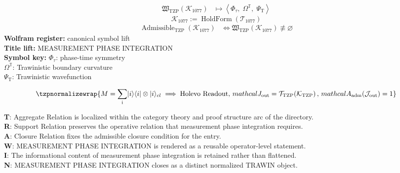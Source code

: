 \noindent
\begin{minipage}[t]{0.48\linewidth}
\begingroup
\small
\[
\begin{aligned}
\mathfrak{W}_{\mathrm{TZP}}\!\left(\mathcal{K}_{1077}\right)
&\longmapsto
\left\langle \Phi_{\tau},\; \Omega^{\mathbb{T}},\; \Psi_{\mathrm{T}} \right\rangle
\end{aligned}
\]
\[
\mathcal{K}_{1077}
:=
\operatorname{HoldForm}\!\left(\mathcal{T}_{1077}\right)
\]
\[
\begin{aligned}
\operatorname{Admissible}_{\mathrm{TZP}}\!\left(\mathcal{K}_{1077}\right)
&\Longleftrightarrow
\mathfrak{W}_{\mathrm{TZP}}\!\left(\mathcal{K}_{1077}\right)\not\equiv\varnothing
\end{aligned}
\]
\textbf{Wolfram register:} canonical symbol lift\\
\textbf{Title lift:} MEASUREMENT PHASE INTEGRATION\\
\textbf{Symbol key:} \(\Phi_{\tau}\): phase-time symmetry\\ \(\Omega^{\mathbb{T}}\): Trawinistic boundary curvature\\ \(\Psi_{\mathrm{T}}\): Trawinistic wavefunction
\par
\endgroup
\end{minipage}\hfill
\begin{minipage}[t]{0.48\linewidth}
\[
\tzpnormalizewrap{M = \sum_{\mathrm{i}} \lvert i \rangle \langle i| \otimes \lvert i \rangle_{cl} \implies \text{Holevo Readout},\,mathcal{J}_{\mathrm{out}} = \mathcal{T}_{\mathrm{TZP}}\!\left(\mathcal{K}_{\mathrm{TZP}}\right),\,mathcal{A}_{\mathrm{adm}}\!\left(\mathcal{J}_{\mathrm{out}}\right)=1}
\]

\small
\textbf{T}: Aggregate Relation is localized within the category theory and proof structure arc of the directory.\\
\textbf{R}: Support Relation preserves the operative relation that measurement phase integration requires.\\
\textbf{A}: Closure Relation fixes the admissible closure condition for the entry.\\
\textbf{W}: MEASUREMENT PHASE INTEGRATION is rendered as a reusable operator-level statement.\\
\textbf{I}: The informational content of measurement phase integration is retained rather than flattened.\\
\textbf{N}: MEASUREMENT PHASE INTEGRATION closes as a distinct normalized TRAWIN object.
\normalsize
\end{minipage}


